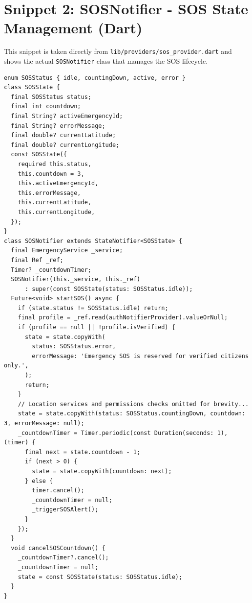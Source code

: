 \documentclass[12pt, a4paper, twoside, openany]{report}
\begin{document}
\section*{Snippet 2: SOSNotifier - SOS State Management (Dart)}
This snippet is taken directly from \texttt{lib/providers/sos\_provider.dart} and shows the actual \texttt{SOSNotifier} class that manages the SOS lifecycle.
\begin{footnotesize}
\begin{verbatim}
enum SOSStatus { idle, countingDown, active, error }
class SOSState {
  final SOSStatus status;
  final int countdown;
  final String? activeEmergencyId;
  final String? errorMessage;
  final double? currentLatitude;
  final double? currentLongitude;
  const SOSState({
    required this.status,
    this.countdown = 3,
    this.activeEmergencyId,
    this.errorMessage,
    this.currentLatitude,
    this.currentLongitude,
  });
}
class SOSNotifier extends StateNotifier<SOSState> {
  final EmergencyService _service;
  final Ref _ref;
  Timer? _countdownTimer;
  SOSNotifier(this._service, this._ref)
      : super(const SOSState(status: SOSStatus.idle));
  Future<void> startSOS() async {
    if (state.status != SOSStatus.idle) return;
    final profile = _ref.read(authNotifierProvider).valueOrNull;
    if (profile == null || !profile.isVerified) {
      state = state.copyWith(
        status: SOSStatus.error,
        errorMessage: 'Emergency SOS is reserved for verified citizens only.',
      );
      return;
    }
    // Location services and permissions checks omitted for brevity...
    state = state.copyWith(status: SOSStatus.countingDown, countdown: 3, errorMessage: null);
    _countdownTimer = Timer.periodic(const Duration(seconds: 1), (timer) {
      final next = state.countdown - 1;
      if (next > 0) {
        state = state.copyWith(countdown: next);
      } else {
        timer.cancel();
        _countdownTimer = null;
        _triggerSOSAlert();
      }
    });
  }
  void cancelSOSCountdown() {
    _countdownTimer?.cancel();
    _countdownTimer = null;
    state = const SOSState(status: SOSStatus.idle);
  }
}
\end{verbatim}
\end{footnotesize}
\vspace{1cm}
\end{document}
